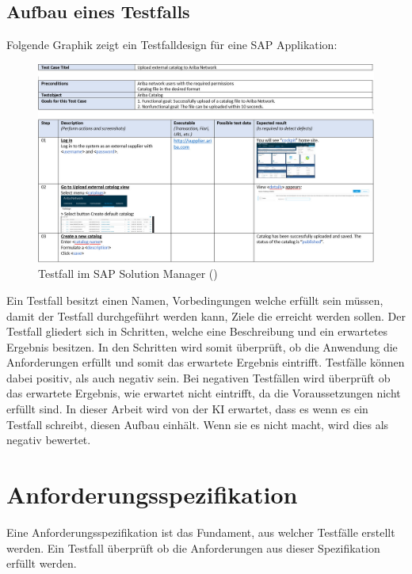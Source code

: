 \documentclass[12pt,toc=bib,toc=listof]{scrreprt}
\begin{document}
\subsection{Aufbau eines Testfalls} %
\label{sec:aufbauEinesTestfalls}
Folgende Graphik zeigt ein Testfalldesign für eine SAP Applikation:

\begin{figure} [H]
    \centering
    \includegraphics[width=1\linewidth]{./Bilder/Enderli_Testfall im SAP Solution Manager.jpg}
    \caption{Testfall im SAP Solution Manager (\cite{Enderli2019})}
    \label{fig:enter-label}
\end{figure}
\noindent Ein Testfall besitzt einen Namen, Vorbedingungen welche erfüllt sein müssen, damit der Testfall durchgeführt werden kann, Ziele die erreicht werden sollen. Der Testfall gliedert sich in Schritten, welche eine Beschreibung und ein erwartetes Ergebnis besitzen. In den Schritten wird somit überprüft, ob die Anwendung die Anforderungen erfüllt und somit das erwartete Ergebnis eintrifft. Testfälle können dabei positiv, als auch negativ sein. Bei negativen Testfällen wird überprüft ob das erwartete Ergebnis, wie erwartet nicht eintrifft, da die Voraussetzungen nicht erfüllt sind. In dieser Arbeit wird von der KI erwartet, dass es wenn es ein Testfall schreibt, diesen Aufbau einhält. Wenn sie es nicht macht, wird dies als negativ bewertet.

\section{Anforderungsspezifikation} %
\label{sec:anforderungsspezifikation}
Eine Anforderungsspezifikation  ist das Fundament, aus welcher Testfälle erstellt werden. Ein Testfall überprüft ob die Anforderungen aus dieser Spezifikation erfüllt werden.
\end{document}
